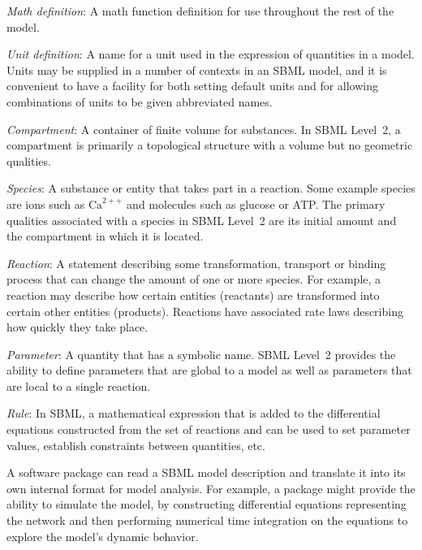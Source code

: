 \documentclass[10pt]{cekarticle}
\begin{document}
\begin{description}

\item \emph{Math definition}: A math function definition for use
    throughout the rest of the model.

\item \emph{Unit definition}: A name for a unit used in the
expression of
  quantities in a model.  Units may be supplied in a number of contexts in
  an SBML model, and it is convenient to have a facility for both setting
  default units and for allowing combinations of units to be given
  abbreviated names.

\item \emph{Compartment}: A container of finite volume for substances. In
  SBML Level~2, a compartment is primarily a topological structure with a
  volume but no geometric qualities.

\item \emph{Species}: A substance or entity that takes part in a
reaction.
  Some example species are ions such as $\text{Ca}^{2++}$ and molecules
  such as glucose or ATP.  The primary qualities associated with a species
  in SBML Level~2 are its initial amount and the compartment in which it is
  located.

\item \emph{Reaction}: A statement describing some transformation,
  transport or binding process that can change the amount of one or more
  species.  For example, a reaction may describe how certain entities
  (reactants) are transformed into certain other entities (products).
  Reactions have associated rate laws describing how quickly they take
  place.

\item \emph{Parameter}: A quantity that has a symbolic name.  SBML
Level~2
  provides the ability to define parameters that are global to a model as
  well as parameters that are local to a single reaction.

\item \emph{Rule}: In SBML, a mathematical expression that is added
  to the differential equations constructed from the set of reactions and
  can be used to set parameter values, establish constraints between
  quantities, etc.

\end{description}

A software package can read a SBML model description and translate it
into its own internal format for model analysis.  For example, a package
might provide the ability to simulate the model, by constructing
differential equations representing the network and then performing
numerical time integration on the equations to explore the model's dynamic
behavior.
\end{document}
